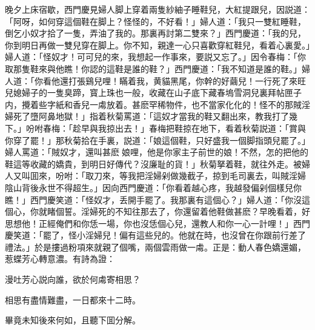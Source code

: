 晚夕上床宿歇，西門慶見婦人脚上穿着兩隻紗紬子睡鞋兒，大紅提跟兒，因説道：「阿呀，如何穿這個鞋在脚上？怪怪的，不好看！」婦人道：「我只一雙紅睡鞋，倒乞小奴才拾了一隻，弄油了我的。那裏再討第二雙來？」西門慶道：「我的兒，你到明日再做一雙兒穿在脚上。你不知，親達一心只喜歡穿紅鞋兒，看着心裏愛。」婦人道：「怪奴才！可可兒的來，我想起一作事來，要説又忘了。」因令春梅：「你取那隻鞋來與他瞧！你認的這鞋是誰的鞋？」西門慶道：「我不知道是誰的鞋。」婦人道：「你看他還打張鷄兒哩！瞞着我，黄貓黑尾，你幹的好繭兒！一行死了來旺兒媳婦子的一隻臭蹄，寳上珠也一般，收藏在山子底下藏春塢雪洞兒裏拜帖匣子内，攪着些字紙和香兒一䖏放着。甚麽罕稀物件，也不當家化化的！怪不的那賊淫婦死了墮阿鼻地獄！」指着秋菊罵道：「這奴才當我的鞋又翻出來，教我打了幾下。」吩咐春梅：「趁早與我掠出去！」春梅把鞋掠在地下，看着秋菊説道：「賞與你穿了罷！」那秋菊拾在手裏，説道：「娘這個鞋，只好盛我一個脚指頭兒罷了。」婦人罵道：「賊奴才，還叫甚麽𣭈娘哩，他是你家主子前世的娘！不然，怎的把他的鞋這等收藏的嬌貴，到明日好傳代？沒廉耻的貨！」秋菊拏着鞋，就往外走。被婦人又叫囬來，吩咐：「取刀來，等我把淫婦剁做幾截子，掠到毛司裏去，叫賊淫婦陰山背後永世不得超生。」因向西門慶道：「你看着越心疼，我越發偏剁個樣兒你瞧！」西門慶笑道：「怪奴才，丢開手罷了。我那裏有這個心？」婦人道：「你沒這個心，你就睹個誓。淫婦死的不知往那去了，你還留着他鞋做甚麽？早晚看着，好思想他！正經俺們和你恁一場，你也沒恁個心兒，還教人和你一心一計哩！」西門慶笑道：「罷了，怪小淫婦兒！偏有這些兒的。他就在時，也沒曾在你跟前行差了禮法。」於是摟過粉項來就親了個嘴，兩個雲雨做一䖏。正是：動人春色嬌還媚，惹蝶芳心轉意濃。有詩為證：

\begin{myquote}
漫吐芳心説向誰，欲於何䖏寄相思？

相思有盡情難盡，一日都來十二時。
\end{myquote}

畢竟未知後來何如，且聽下囬分解。

